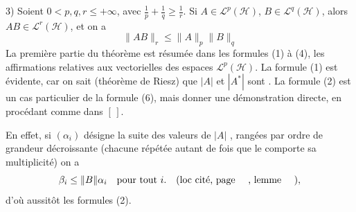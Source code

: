 3) Soient $0<p,q,r\leq+\infty$, avec $\frac{1}{p}+\frac{1}{q}\geq\frac{1}{r}$. Si 
$A\in\mathcal L^p(\mathcal H)$, $B\in\mathcal L^q(\mathcal H)$, alors $AB\in\mathcal L^r(\mathcal H)$, et on a
\[
\|AB\|_r\leq\|A\|_p\|B\|_q\tag*{(6)}
\]
La première partie du théorème est résumée dans les
formules (1) à (4),   les affirmations relatives
aux  vectorielles des espaces $\mathcal L^p(\mathcal H)$.
La formule (1) est évidente, car 
  on sait (théorème
de Riesz) que $|A|$ et $|A^*|$ sont  
 . La formule (2) est un cas
particulier de la formule (6), mais  
donner une démonstration 
directe, en procédant comme dans $[\,]$.

En effet, si $(\alpha_i)$  désigne la
suite des valeurs  de  $|A|$
 ,
rangées par ordre de grandeur
décroissante (chacune répétée autant de fois
que le comporte sa multiplicité) on a
\[
\beta_i\leq\|B\|\alpha_i\quad\text{pour tout }i.\quad(\text{loc cité, page \quad, lemme \quad}),
\]
d'où aussitôt les formules (2).

